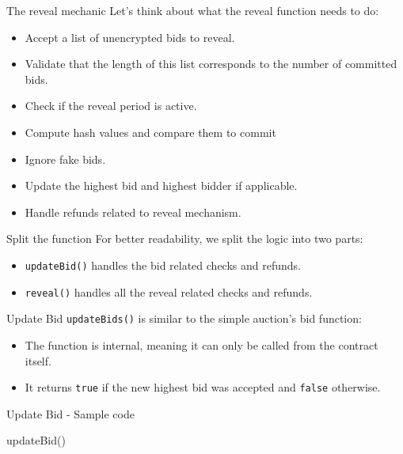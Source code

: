 \documentclass[]{beamer}
\begin{document}
\begin{frame}{The reveal mechanic}
	Let's think about what the reveal function needs to do:
	\begin{itemize}
		\item<2-> Accept a list of unencrypted bids to reveal.
		\item<3-> Validate that the length of this list corresponds to the number of committed bids.
		\item<4-> Check if the reveal period is active.
		\item<5-> Compute hash values and compare them to commit
		\item<6-> Ignore fake bids.
		\item<7-> Update the highest bid and highest bidder if applicable.
		\item<8-> Handle refunds related to reveal mechanism.
	\end{itemize}
\end{frame}

\begin{frame}{Split the function}
For better readability, we split the logic into two parts:
	\begin{itemize}
		\item<2-> \texttt{updateBid()} handles the bid related checks and refunds.
		\item<3-> \texttt{reveal()} handles all the reveal related checks and refunds.
	\end{itemize}
\end{frame}

\begin{frame}{Update Bid}
\texttt{updateBids()} is similar to the simple auction's bid function:
	\begin{itemize}
		\item<2-> The function is internal, meaning it can only be called from the contract itself.
		\item<3-> It returns \texttt{true} if the new highest bid was accepted and \texttt{false} otherwise.
	\end{itemize} 	
\end{frame}

\begin{frame}{Update Bid - Sample code}
	\begin{samplecode}{updateBid()}
		
	\end{samplecode}
\end{frame}
\end{document}
